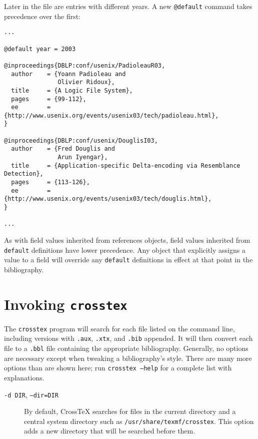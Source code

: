 \documentclass{article}
\newcommand{\XTeX}{Cross\TeX}
\begin{document}
Later in the file are entries with different years. A new \texttt{@default} command takes precedence over the first:

\begin{small}\begin{verbatim}
...

@default year = 2003

@inproceedings{DBLP:conf/usenix/PadioleauR03,
  author    = {Yoann Padioleau and
               Olivier Ridoux},
  title     = {A Logic File System},
  pages     = {99-112},
  ee        = {http://www.usenix.org/events/usenix03/tech/padioleau.html},
}

@inproceedings{DBLP:conf/usenix/DouglisI03,
  author    = {Fred Douglis and
               Arun Iyengar},
  title     = {Application-specific Delta-encoding via Resemblance Detection},
  pages     = {113-126},
  ee        = {http://www.usenix.org/events/usenix03/tech/douglis.html},
}

...
\end{verbatim}\end{small}

As with field values inherited from references objects, field values
inherited from \texttt{default} definitions have lower precedence. Any
object that explicitly assigns a value to a field will override any 
\texttt{default} definitions in effect at that point in the bibliography.


\section{Invoking \texttt{crosstex}}

The \texttt{crosstex} program will search for each file listed on the command line, including versions with \texttt{.aux}, \texttt{.xtx}, and \texttt{.bib} appended. It will then convert each file to a \texttt{.bbl} file containing the appropriate bibliography. Generally, no options are necessary except when tweaking a bibliography's style. There are many more options than are shown here; run \texttt{crosstex --help} for a complete list with explanations.

\begin{description}
\item[\texttt{-d DIR}, \texttt{--dir=DIR}]
By default, \XTeX{} searches for files in the current directory and a central system directory such as \texttt{/usr/share/texmf/crosstex}. This option adds a new directory that will be searched before them.
\end{description}
\end{document}
